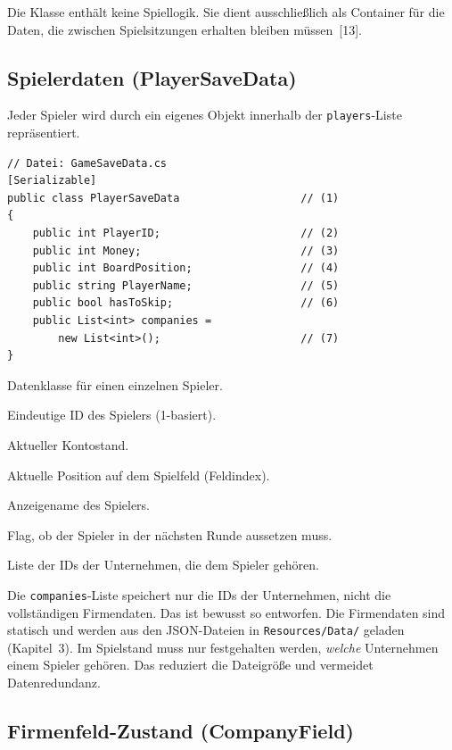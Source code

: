 \documentclass[12pt,a4paper]{article}
\begin{document}
Die Klasse enthält keine Spiellogik. Sie dient ausschließlich als Container für die Daten, die zwischen Spielsitzungen erhalten bleiben müssen~[13].

\subsection{Spielerdaten (PlayerSaveData)}

Jeder Spieler wird durch ein eigenes Objekt innerhalb der \texttt{players}-Liste repräsentiert.

\begin{lstlisting}
// Datei: GameSaveData.cs
[Serializable]
public class PlayerSaveData                   // (1)
{
    public int PlayerID;                      // (2)
    public int Money;                         // (3)
    public int BoardPosition;                 // (4)
    public string PlayerName;                 // (5)
    public bool hasToSkip;                    // (6)
    public List<int> companies =
        new List<int>();                      // (7)
}
\end{lstlisting}

\begin{description}[leftmargin=2em, labelwidth=1.5em]
    \item[(1)] Datenklasse für einen einzelnen Spieler.
    \item[(2)] Eindeutige ID des Spielers (1-basiert).
    \item[(3)] Aktueller Kontostand.
    \item[(4)] Aktuelle Position auf dem Spielfeld (Feldindex).
    \item[(5)] Anzeigename des Spielers.
    \item[(6)] Flag, ob der Spieler in der nächsten Runde aussetzen muss.
    \item[(7)] Liste der IDs der Unternehmen, die dem Spieler gehören.
\end{description}

Die \texttt{companies}-Liste speichert nur die IDs der Unternehmen, nicht die vollständigen Firmendaten. Das ist bewusst so entworfen. Die Firmendaten sind statisch und werden aus den JSON-Dateien in \texttt{Resources/Data/} geladen (Kapitel~3). Im Spielstand muss nur festgehalten werden, \textit{welche} Unternehmen einem Spieler gehören. Das reduziert die Dateigröße und vermeidet Datenredundanz.

\subsection{Firmenfeld-Zustand (CompanyField)}
\end{document}
